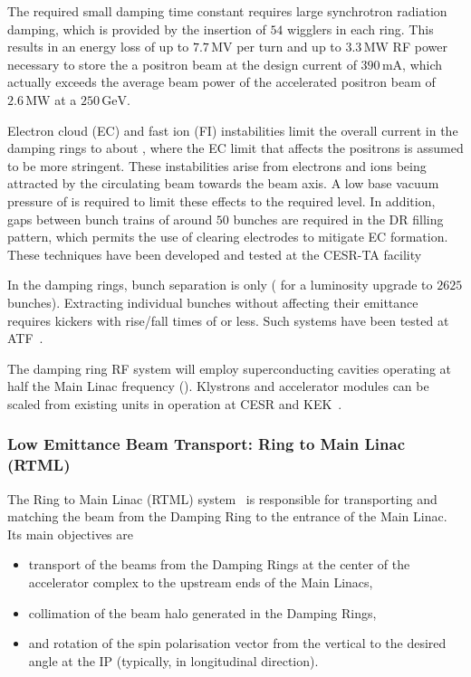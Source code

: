 The required small damping time constant requires large synchrotron radiation damping, which is provided by the insertion of $54$ wigglers in each ring.
This results in an energy loss of up to $7.7\,{\mathrm{MV}}$ per turn and up to $3.3\,{\mathrm{MW}}$ RF power necessary to 
store the a positron beam at the design current of $390\,{\mathrm{mA}}$, which
actually exceeds the average beam power of the accelerated positron beam of $2.6\,{\mathrm{MW}}$ at 
a $250\,{\mathrm{GeV}}$.

Electron cloud (EC) and fast ion (FI) instabilities limit the overall current in the damping rings to about , where the EC limit that affects the positrons is assumed to be more stringent. 
These instabilities arise from electrons and ions being attracted by the circulating beam towards the beam axis. 
A low base vacuum pressure of  is required to limit these effects to the required level.
In addition, gaps between bunch trains of around $50$ bunches are required in the DR filling pattern, which permits the use of clearing electrodes to mitigate EC formation.
These techniques have been developed and tested at the CESR-TA facility~\cite{Conway:2012zza}

In the damping rings, bunch separation is only  ( for a luminosity upgrade to $2625$ bunches). 
Extracting individual bunches without affecting their emittance requires kickers with rise/fall times of  or less.
Such systems have been tested at ATF~\cite{Naito:2010zzb}.

The damping ring RF system will employ superconducting cavities operating at half the Main Linac frequency ().
Klystrons and accelerator modules can be scaled from existing  units in operation at CESR and KEK~\cite[Sec. 6.6]{Adolphsen:2013kya}. 


\subsubsection{Low Emittance Beam Transport: Ring to Main Linac (RTML)}
\label{sec:rtml}

The Ring to Main Linac (RTML) system~\cite[Chap. 7]{Adolphsen:2013kya} is responsible for transporting and matching the beam from the Damping Ring to the entrance of the Main Linac.
Its main objectives are
\begin{itemize} 
\item transport of the beams from the Damping Rings at the center of the accelerator complex to the upstream ends of the Main Linacs,
\item collimation of the beam halo generated in the Damping Rings,
\item and rotation of the spin polarisation vector from the vertical to the desired angle at the IP (typically, in longitudinal direction).
\end{itemize}

